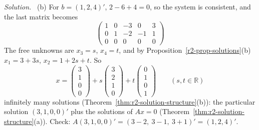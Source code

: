 \documentclass[12pt]{article}
\newcommand{\R}{\mathbb R}
\theoremstyle{definition}
\newenvironment{solution}{\par\noindent\textit{Solution.}\ }{\par\smallskip}
\begin{document}
\begin{solution}
(b) For \(b=(1,2,4)'\), \(2-6+4=0\), so the system is consistent, and the last matrix becomes
\[
\left(\begin{array}{cccc|c}1&0&-3&0&3\\0&1&-2&-1&1\\0&0&0&0&0\end{array}\right)
\]
The free unknowns are \(x_3=s\), \(x_4=t\), and by Proposition~\ref{r2-prop-solutions}(b)
\(x_1=3+3s\), \(x_2=1+2s+t\). So
\[
x=\begin{pmatrix}3\\1\\0\\0\end{pmatrix}+s\begin{pmatrix}3\\2\\1\\0\end{pmatrix}+t\begin{pmatrix}0\\1\\0\\1\end{pmatrix}\qquad(s,t\in\R)
\]
infinitely many solutions (Theorem~\ref{thm:r2-solution-structure}(b)): the particular solution
\((3,1,0,0)'\) plus the solutions of \(Ax=0\) (Theorem~\ref{thm:r2-solution-structure}(a)).
Check: \(A(3,1,0,0)'=(3-2,\ 3-1,\ 3+1)'=(1,2,4)'\).
\end{solution}
\end{document}
